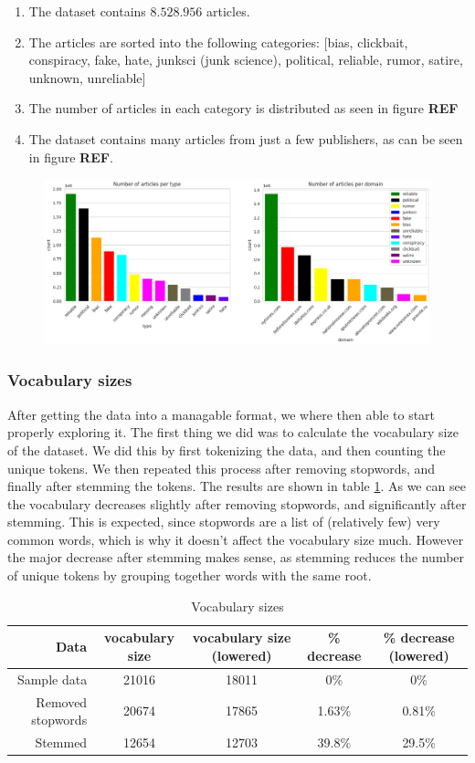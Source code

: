 \begin{enumerate}
  \item The dataset contains $ 8.528.956 $ articles.
  \item The articles are sorted into the following categories: [bias, clickbait, conspiracy, fake, hate, junksci (junk
    science), political, reliable, rumor, satire, unknown, unreliable]
  \item The number of articles in each category is distributed as seen in figure \textbf{REF}
  \item The dataset contains many articles from just a few publishers, as can be seen in figure \textbf{REF}.
\end{enumerate}

\begin{figure}[htpb]
  \centering
  \includegraphics[width=1\textwidth]{combdist}
  \caption{}
  \label{fig:}
\end{figure}
\subsubsection{Vocabulary sizes}
After getting the data into a managable format, we where then able to start properly exploring it. The first thing we
did was to calculate the vocabulary size of the dataset. We did this by first tokenizing the data, and then counting the
unique tokens. We then repeated this process after removing stopwords, and finally after stemming the tokens. The
results are shown in table \ref{tab:vocab_sizes}. As we can see the vocabulary decreases slightly after removing
stopwords, and significantly after stemming. This is expected, since stopwords are a list of (relatively few) very
common words, which is why it doesn't affect the vocabulary size much. However the major decrease after stemming makes
sense, as stemming reduces the number of unique tokens by grouping together words with the same root.


\begin{table}[h]
    \centering
    \begin{tabular}{r| c | c | c| c}
      Data& vocabulary size & vocabulary size (lowered) & \% decrease & \% decrease (lowered)\\
        \hline
      Sample data& 21016 & 18011 & 0\% & 0\% \\
    \hline
      Removed stopwords & 20674 & 17865 & 1.63\% & 0.81\% \\
    \hline
      Stemmed & 12654 & 12703 & 39.8\% & 29.5\%
    \end{tabular}
    \caption{Vocabulary sizes}
    \label{tab:vocab_sizes}
\end{table}

